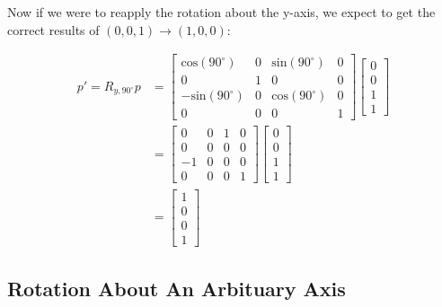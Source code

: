 \documentclass[12pt,letterpaper]{article}
\begin{document}
\newpage

Now if we were to reapply the rotation about the y-axis, we expect to get the correct results of $(0, 0, 1) \rightarrow (1, 0, 0)$:

\begin{equation}
    \begin{aligned}
    p' = R_{y, 90^{\circ}}p
    &= \begin{bmatrix}
        \text{cos}(90^{\circ})    & 0     & \text{sin}(90^{\circ}) & 0 \\
        0                         & 1     &  0                      & 0 \\
       -\text{sin}(90^{\circ})    & 0     &  \text{cos}(90^{\circ}) & 0 \\
        0                         & 0     &  0                      & 1
    \end{bmatrix}
     \begin{bmatrix}
        0 \\
        0 \\
        1 \\
        1
    \end{bmatrix} \\
    &= \begin{bmatrix}
        0 & 0 &  1 & 0 \\
        0 & 0 &  0 & 0 \\
       -1 & 0 &  0 & 0 \\
        0 & 0 &  0 & 1
    \end{bmatrix}
     \begin{bmatrix}
        0 \\
        0 \\
        1 \\
        1
    \end{bmatrix} \\
    &= \begin{bmatrix}
        1 \\
        0 \\
        0 \\
        1
    \end{bmatrix}
    \end{aligned}
\end{equation}

\subsection{Rotation About An Arbituary Axis}
\end{document}
